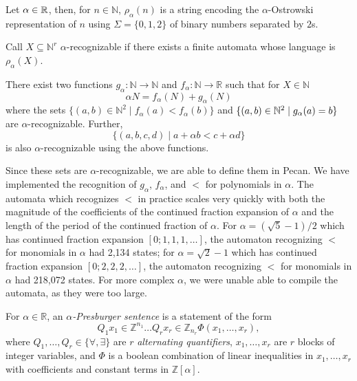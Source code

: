 \documentclass[10pt,usenames,dvipsnames]{article}
\begin{document}
\begin{definition}
Let $\alpha \in \mathbb{R}$, then, for $n \in \mathbb N$, $\rho_{\alpha} (n)$ is a string encoding the $\alpha$-Ostrowski representation of $n$ using $\Sigma = \{0,1,2\}$ of binary numbers separated by $2$s.
\end{definition}

\begin{definition}
Call $X \subseteq \mathbb N ^ r$ $\alpha$-recognizable if there exists a finite automata whose language is $\rho_{\alpha} (X)$. %
\end{definition}

\begin{theorem}
There exist two functions $g_{\alpha}: \mathbb N \to \mathbb N$ and $f_{\alpha}: \mathbb N \to \mathbb R$ such that for $X \in \mathbb N$
$$\alpha N = f_{\alpha} (N) + g_{\alpha} (N)$$
where the sets $\{ (a,b) \in \mathbb N^2 \mid f_{\alpha}(a) < f_{\alpha}(b) \}$ and $\{ (a,b) \in \mathbb{N}^2 \mid g_{\alpha} (a) = b \}$ are $\alpha$-recognizable. Further, 
$$\{ (a,b,c,d) \mid a + \alpha b < c + \alpha d \}$$
is also $\alpha$-recognizable using the above functions.
\end{theorem}

Since these sets are $\alpha$-recognizable, we are able to define them in Pecan.
We have implemented the recognition of $g_\alpha$, $f_\alpha$, and $<$ for polynomials in $\alpha$.
The automata which recognizes $<$ in practice scales very quickly with both the magnitude of the coefficients of the continued fraction expansion of $\alpha$ and the length of the period of the continued fraction of $\alpha$.
For $\alpha = (\sqrt 5 - 1)/2 $ which has continued fraction expansion $[0;1,1,1,\dots]$, the automaton recognizing $<$ for monomials in $\alpha$ had 2,134 states; for $\alpha = \sqrt 2 - 1$ which has continued fraction expansion $[0;2,2,2,\dots]$, the automaton recognizing $<$ for monomials in $\alpha$ had 218,072 states. 
For more complex $\alpha$, we were unable able to compile the automata, as they were too large.

\begin{definition}
    For $\alpha \in \mathbb R$, an \emph{$\alpha$-Presburger sentence} is a statement of the form
    \[
        Q_1 x_1 \in \mathbb Z ^{n_1} \dots Q_r x_r \in \mathbb Z_{n_r} \Phi (x_1, \dots, x_r),
    \]
    where $Q_1, \dots, Q_r \in \{ \forall, \exists \}$ are $r$ \emph{alternating quantifiers}, $x_1, \dots, x_r$ are $r$ blocks of integer variables, and $\Phi$ is a boolean combination of linear inequalities in $x_1, \dots, x_r$ with coefficients and constant terms in $\mathbb Z [ \alpha ]$.
\end{definition}
\end{document}
